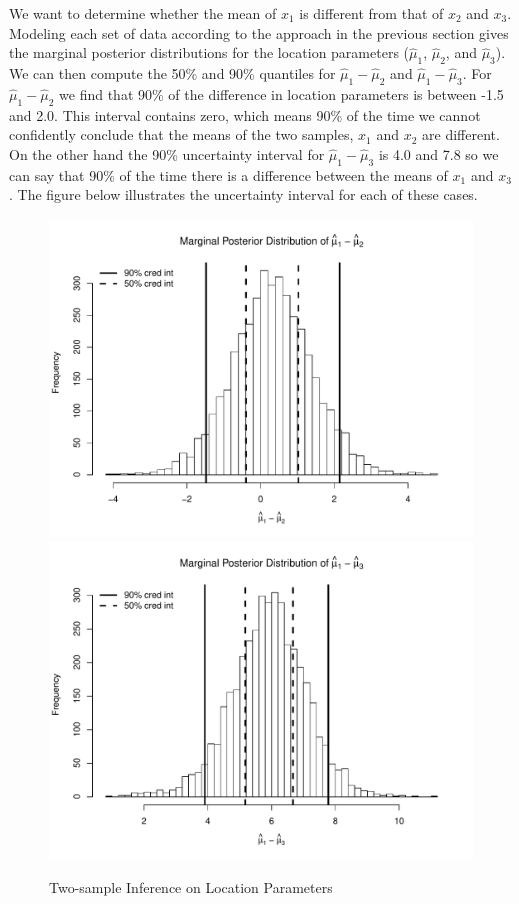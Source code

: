 \documentclass[12pt]{article}
\begin{document}
\noindent We want to determine whether the mean of $x_1$ is different from that of $x_2$ and $x_3$. Modeling each set of data according to the approach in the previous section gives the marginal posterior distributions for the location parameters ($\hat{\mu}_1$, $\hat{\mu}_2$, and $\hat{\mu}_3$). We can then compute the 50\% and 90\% quantiles for $\hat{\mu}_1 - \hat{\mu}_2$ and $\hat{\mu}_1 - \hat{\mu}_3$. For $\hat{\mu}_1 - \hat{\mu}_2$ we find that 90\% of the difference in location parameters is between -1.5 and 2.0. This interval contains zero, which means 90\% of the time we cannot confidently conclude that the means of the two samples, $x_1$ and $x_2$ are different. On the other hand the 90\% uncertainty interval for $\hat{\mu}_1 - \hat{\mu}_3$ is 4.0 and 7.8 so we can say that 90\% of the time there is a difference between the means of $x_1$ and $x_3$. The figure below illustrates the uncertainty interval for each of these cases.

\begin{figure}[H]\caption[]{Two-sample Inference on Location Parameters}
\begin{minipage}{1\linewidth}
  \centering
\includegraphics[trim={0cm 0cm 0cm 0cm}, clip, scale=0.4]{../figs/norm2.pdf}
\includegraphics[trim={0cm 0cm 0cm 0cm}, clip, scale=0.4]{../figs/norm3.pdf}
\footnotesize
\end{minipage}
\end{figure}
\end{document}
